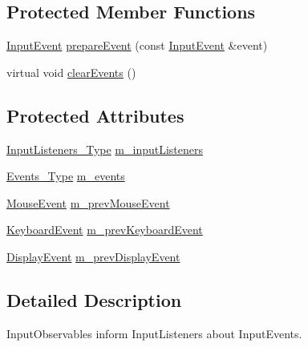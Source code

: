 \subsection*{Protected Member Functions}
\begin{DoxyCompactItemize}
\item 
\mbox{\hyperlink{structec_1_1_input_event}{Input\+Event}} \mbox{\hyperlink{classec_1_1_input_observable_a7aaa88f25dd3d8902bc6767240c83ecf}{prepare\+Event}} (const \mbox{\hyperlink{structec_1_1_input_event}{Input\+Event}} \&event)
\item 
virtual void \mbox{\hyperlink{classec_1_1_input_observable_a799c88abda6814473fe486654205f07b}{clear\+Events}} ()
\end{DoxyCompactItemize}
\subsection*{Protected Attributes}
\begin{DoxyCompactItemize}
\item 
\mbox{\hyperlink{classec_1_1_input_observable_a7a1e7fe634b426e59ddae7f11c21bebb}{Input\+Listeners\+\_\+\+Type}} \mbox{\hyperlink{classec_1_1_input_observable_a05b1b085184216601228522319efbe56}{m\+\_\+input\+Listeners}}
\item 
\mbox{\hyperlink{classec_1_1_input_observable_ac2476cc82c72ba20dcd8d5c89794f577}{Events\+\_\+\+Type}} \mbox{\hyperlink{classec_1_1_input_observable_a26f25d660227364fe1a1be19671af09e}{m\+\_\+events}}
\item 
\mbox{\hyperlink{structec_1_1_mouse_event}{Mouse\+Event}} \mbox{\hyperlink{classec_1_1_input_observable_a99e8c1484fe87503096e681d8bd3b75f}{m\+\_\+prev\+Mouse\+Event}}
\item 
\mbox{\hyperlink{structec_1_1_keyboard_event}{Keyboard\+Event}} \mbox{\hyperlink{classec_1_1_input_observable_acf14cdeb5a394fbd296ff3dfb391c14f}{m\+\_\+prev\+Keyboard\+Event}}
\item 
\mbox{\hyperlink{structec_1_1_display_event}{Display\+Event}} \mbox{\hyperlink{classec_1_1_input_observable_ae480593ec25d98ea00b0b7a9aa6cba32}{m\+\_\+prev\+Display\+Event}}
\end{DoxyCompactItemize}


\subsection{Detailed Description}
Input\+Observables inform Input\+Listeners about Input\+Events. 

